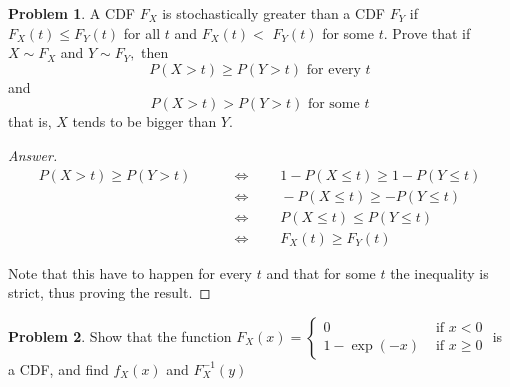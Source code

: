 \documentclass{article}
\theoremstyle{definition}
\newtheorem{problem}{Problem}
\newcommand{\qiffq}{\qquad \iff \qquad}
\begin{document}
\begin{problem}
A CDF $F_{X}$ is stochastically greater than a CDF $F_{Y}$ if $F_{X}(t) \leq F_{Y}(t)$ for all $t$ and $F_{X}(t)<$ $F_{Y}(t)$ for some $t .$ Prove that if $X \sim F_{X}$ and $Y \sim F_{Y},$ then
$$
P(X>t) \geq P(Y>t) \text { for every } t
$$
and
$$
P(X>t)>P(Y>t) \text { for some } t
$$
that is, $X$ tends to be bigger than $Y$.
\end{problem}

\begin{proof}[Answer]

\begin{align*}
    P(X>t) \geq P(Y>t) &\qiffq 1 - P(X\leq t) \geq 1 -  P(Y\leq t)\\
    &\qiffq - P(X\leq t) \geq -  P(Y\leq t)\\
    &\qiffq  P(X\leq t) \leq  P(Y\leq t)\\
    &\qiffq F_{X}(t) \geq F_{Y}(t)
\end{align*}

Note that this have to happen for every $t$ and that for some $t$ the inequality is strict, thus proving the result. 

\end{proof}

\begin{problem}
Show that the function $F_{X}(x)=\left\{\begin{array}{ll}0 & \text { if } x<0 \\ 1-\exp (-x) & \text { if } x \geq 0\end{array}\right.$ is a CDF, and find $f_{X}(x)$ and $F_{X}^{-1}(y)$
\end{problem}
\end{document}
